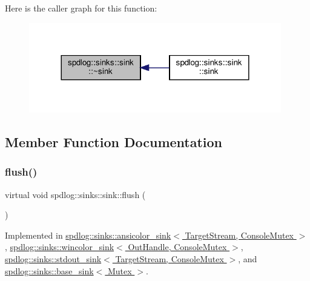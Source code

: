 Here is the caller graph for this function\+:
\nopagebreak
\begin{figure}[H]
\begin{center}
\leavevmode
\includegraphics[width=312pt]{classspdlog_1_1sinks_1_1sink_a2637af0973ac863eedd76ee683279c0b_icgraph}
\end{center}
\end{figure}


\subsection{Member Function Documentation}
\mbox{\label{classspdlog_1_1sinks_1_1sink_a8a0674ae3bca8f1617aef820e23a2ccd}} 
\subsubsection{\texorpdfstring{flush()}{flush()}}
{\footnotesize\ttfamily virtual void spdlog\+::sinks\+::sink\+::flush (\begin{DoxyParamCaption}{ }\end{DoxyParamCaption})\hspace{0.3cm}{\ttfamily [pure virtual]}}



Implemented in \hyperlink{classspdlog_1_1sinks_1_1ansicolor__sink_a3c0587e868d2a42f96b878c6031333a0}{spdlog\+::sinks\+::ansicolor\+\_\+sink$<$ Target\+Stream, Console\+Mutex $>$}, \hyperlink{classspdlog_1_1sinks_1_1wincolor__sink_a3746a35fc36218e76dc3080e52fe6233}{spdlog\+::sinks\+::wincolor\+\_\+sink$<$ Out\+Handle, Console\+Mutex $>$}, \hyperlink{classspdlog_1_1sinks_1_1stdout__sink_af3a13cc82215681bdd7ca5e33a7c28b5}{spdlog\+::sinks\+::stdout\+\_\+sink$<$ Target\+Stream, Console\+Mutex $>$}, and \hyperlink{classspdlog_1_1sinks_1_1base__sink_a2de93f1edc37e891555685ed4e520343}{spdlog\+::sinks\+::base\+\_\+sink$<$ Mutex $>$}.

